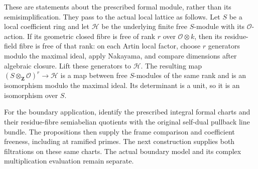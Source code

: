 These are statements about the prescribed formal module, rather
than its semisimplification. They pass to the actual local
lattice as follows. Let $S$ be a local coefficient ring and let
$\mathcal H$ be the underlying finite free $S$-module with its
$\mathcal O$-action. If its geometric closed fibre is free of rank
$r$ over $\mathcal O\otimes k$, then its residue-field fibre is
free of that rank: on each Artin local factor, choose $r$ generators
modulo the maximal ideal, apply Nakayama, and compare dimensions
after algebraic closure. Lift these generators to $\mathcal H$.
The resulting map
$(S\otimes_{\mathbf Z}\mathcal O)^r\to\mathcal H$ is a map between
free $S$-modules of the same rank and is an isomorphism modulo
the maximal ideal. Its determinant is a unit, so it is an
isomorphism over $S$.

For the boundary application, identify the prescribed integral
formal charts and their residue-fibre semiabelian quotients with
the original self-dual pullback line bundle. The propositions
then supply the frame comparison and coefficient freeness,
including at ramified primes. The next construction supplies
both filtrations on these same charts. The actual boundary
model and its complex multiplication evaluation remain separate.
